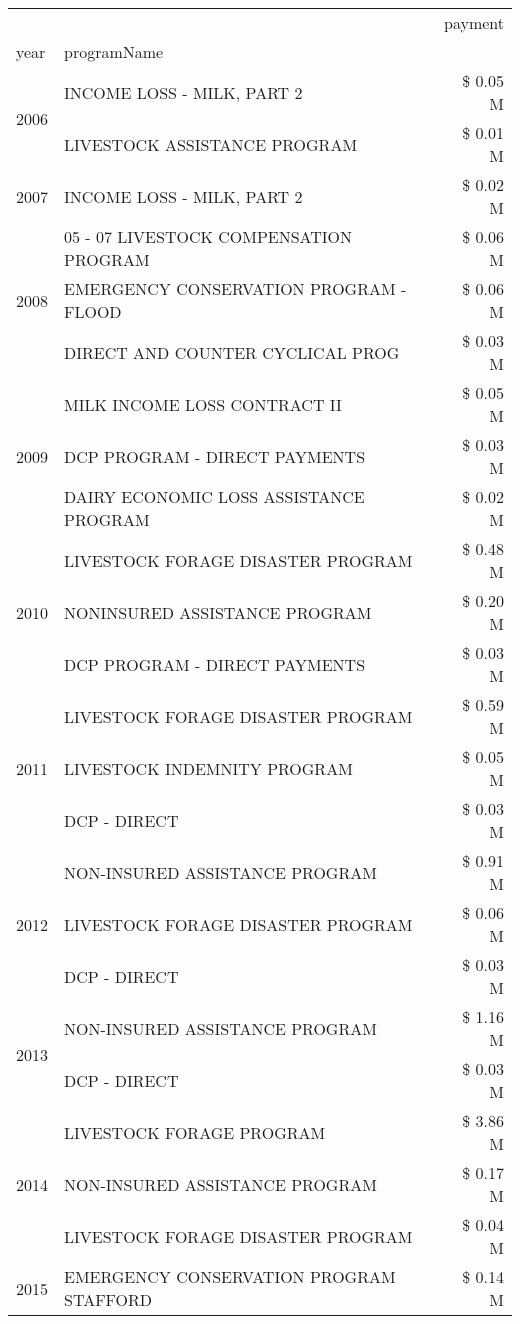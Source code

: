 \begin{tabular}{llr}
\toprule
 &  & payment \\
year & programName &  \\
\midrule
\multirow[t]{2}{*}{2006} & INCOME LOSS - MILK, PART 2 & \$ 0.05 M \\
 & LIVESTOCK ASSISTANCE PROGRAM & \$ 0.01 M \\
\cline{1-3}
2007 & INCOME LOSS - MILK, PART 2 & \$ 0.02 M \\
\cline{1-3}
\multirow[t]{3}{*}{2008} & 05 - 07 LIVESTOCK COMPENSATION PROGRAM & \$ 0.06 M \\
 & EMERGENCY CONSERVATION PROGRAM - FLOOD & \$ 0.06 M \\
 & DIRECT AND COUNTER CYCLICAL PROG & \$ 0.03 M \\
\cline{1-3}
\multirow[t]{3}{*}{2009} & MILK INCOME LOSS CONTRACT II & \$ 0.05 M \\
 & DCP PROGRAM - DIRECT PAYMENTS & \$ 0.03 M \\
 & DAIRY ECONOMIC LOSS ASSISTANCE PROGRAM & \$ 0.02 M \\
\cline{1-3}
\multirow[t]{3}{*}{2010} & LIVESTOCK FORAGE DISASTER  PROGRAM & \$ 0.48 M \\
 & NONINSURED ASSISTANCE PROGRAM & \$ 0.20 M \\
 & DCP PROGRAM - DIRECT PAYMENTS & \$ 0.03 M \\
\cline{1-3}
\multirow[t]{3}{*}{2011} & LIVESTOCK FORAGE DISASTER PROGRAM & \$ 0.59 M \\
 & LIVESTOCK INDEMNITY PROGRAM & \$ 0.05 M \\
 & DCP - DIRECT & \$ 0.03 M \\
\cline{1-3}
\multirow[t]{3}{*}{2012} & NON-INSURED ASSISTANCE PROGRAM & \$ 0.91 M \\
 & LIVESTOCK FORAGE DISASTER PROGRAM & \$ 0.06 M \\
 & DCP - DIRECT & \$ 0.03 M \\
\cline{1-3}
\multirow[t]{2}{*}{2013} & NON-INSURED ASSISTANCE PROGRAM & \$ 1.16 M \\
 & DCP - DIRECT & \$ 0.03 M \\
\cline{1-3}
\multirow[t]{3}{*}{2014} & LIVESTOCK FORAGE PROGRAM & \$ 3.86 M \\
 & NON-INSURED ASSISTANCE PROGRAM & \$ 0.17 M \\
 & LIVESTOCK FORAGE DISASTER PROGRAM & \$ 0.04 M \\
\cline{1-3}
\multirow[t]{3}{*}{2015} & EMERGENCY CONSERVATION PROGRAM STAFFORD & \$ 0.14 M \\

\end{tabular}
